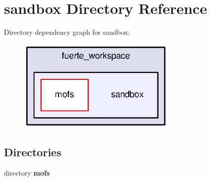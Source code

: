 \section{sandbox Directory Reference}
\label{dir_069a21ac3e1d91fc54c5439cefaf2134}
Directory dependency graph for sandbox\-:\nopagebreak
\begin{figure}[H]
\begin{center}
\leavevmode
\includegraphics[width=218pt]{dir_069a21ac3e1d91fc54c5439cefaf2134_dep}
\end{center}
\end{figure}
\subsection*{Directories}
\begin{DoxyCompactItemize}
\item 
directory {\bf mofs}
\end{DoxyCompactItemize}
